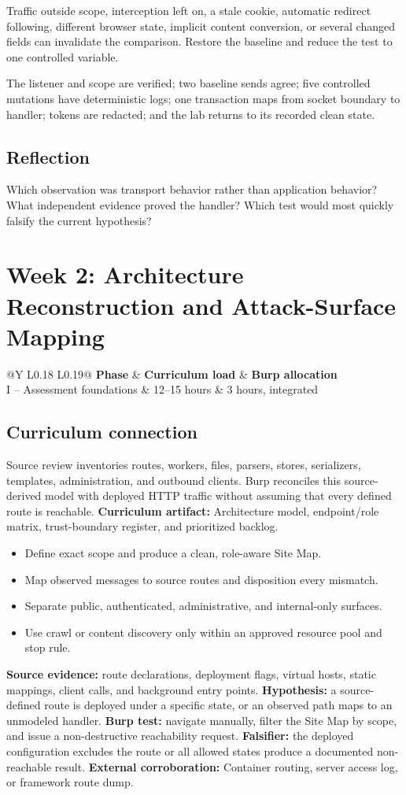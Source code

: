 \documentclass[11pt]{article}
\makeatletter
\newcommand{\weekheader}[5]{%
  \clearpage
  \section{Week #1: #2}
  \begin{tcolorbox}[colback=Navy,colframe=Navy,coltext=white]
    \begin{tabularx}{\linewidth}{@{}Y L{0.18\linewidth} L{0.19\linewidth}@{}}
      \textbf{Phase} & \textbf{Curriculum load} & \textbf{Burp allocation}\\
      #3 & #4 hours & #5 hours, integrated
    \end{tabularx}
  \end{tcolorbox}
}
\newcommand{\weekfield}[2]{%
  \Needspace{5\baselineskip}
  \subsection*{#1}
  #2
}
\newcommand{\curriculumartifact}[1]{\textbf{Curriculum artifact:} #1}
\newcommand{\externalproof}[1]{\textbf{External corroboration:} #1}
\makeatother
\begin{document}
\begin{troubleshootingbox}
Traffic outside scope, interception left on, a stale cookie, automatic redirect
following, different browser state, implicit content conversion, or several
changed fields can invalidate the comparison. Restore the baseline and reduce
the test to one controlled variable.
\end{troubleshootingbox}

\begin{checkpoints}
The listener and scope are verified; two baseline sends agree; five controlled
mutations have deterministic logs; one transaction maps from socket boundary to
handler; tokens are redacted; and the lab returns to its recorded clean state.
\end{checkpoints}

\weekfield{Reflection}{Which observation was transport behavior rather than
application behavior? What independent evidence proved the handler? Which test
would most quickly falsify the current hypothesis?}

\weekheader{2}{Architecture Reconstruction and Attack-Surface Mapping}{I -- Assessment foundations}{12--15}{3}

\weekfield{Curriculum connection}{Source review inventories routes, workers,
files, parsers, stores, serializers, templates, administration, and outbound
clients. Burp reconciles this source-derived model with deployed HTTP traffic
without assuming that every defined route is reachable. \curriculumartifact{Architecture
model, endpoint/role matrix, trust-boundary register, and prioritized backlog.}}

\begin{objectivebox}
\begin{itemize}
  \item Define exact scope and produce a clean, role-aware Site Map.
  \item Map observed messages to source routes and disposition every mismatch.
  \item Separate public, authenticated, administrative, and internal-only surfaces.
  \item Use crawl or content discovery only within an approved resource pool and stop rule.
\end{itemize}
\end{objectivebox}

\begin{bridgebox}
\textbf{Source evidence:} route declarations, deployment flags, virtual hosts,
static mappings, client calls, and background entry points. \textbf{Hypothesis:}
a source-defined route is deployed under a specific state, or an observed path
maps to an unmodeled handler. \textbf{Burp test:} navigate manually, filter the
Site Map by scope, and issue a non-destructive reachability request. \textbf{Falsifier:}
the deployed configuration excludes the route or all allowed states produce a
documented non-reachable result. \externalproof{Container routing, server access
log, or framework route dump.}
\end{bridgebox}
\end{document}
